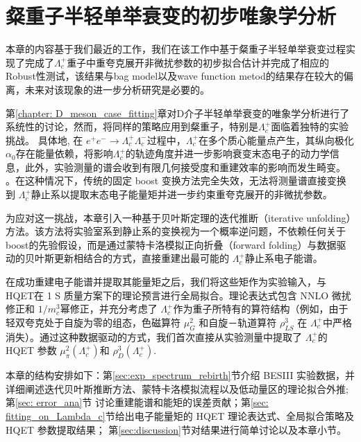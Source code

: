 \chapter{粲重子半轻单举衰变的初步唯象学分析}
\label{sec:charm_baryon_case}
本章的内容基于我们最近的工作\cite{Shao:2025rel}，我们在该工作中基于粲重子半轻单举衰变过程实现了完成了$\Lambda_c^+$重子中重夸克展开非微扰参数的初步拟合估计并完成了相应的Robust性测试，该结果与bag model以及wave function metod的结果存在较大的偏离，未来对该现象的进一步分析研究是必要的。

第\ref{chapter: D_meson_case_fitting}章对D介子半轻单举衰变的唯象学分析进行了系统性的讨论，然而，将同样的策略应用到粲重子，特别是$\Lambda_c^+$面临着独特的实验挑战。
具体地, 在 $e^{+} e^{-} \rightarrow \Lambda_c^{+} \Lambda_c^{-}$过程中，$\Lambda_c^{+}$在多个质心能量点产生，其纵向极化$\alpha_0$存在能量依赖，将影响$\Lambda_c^+$的轨迹角度并进一步影响衰变末态电子的动力学信息，此外，实验测量的谱会收到有限几何接受度和重建效率的影响而发生畸变。 。在这种情况下，传统的固定 boost 变换方法完全失效，无法将测量谱直接变换到 $\Lambda_c^{+}$静止系以提取末态电子能量矩并进一步约束重夸克展开的非微扰参数。

为应对这一挑战，本章引入一种基于贝叶斯定理的迭代推断（iterative unfolding）方法。该方法将实验室系到静止系的变换视为一个概率逆问题，不依赖任何关于 boost的先验假设，而是通过蒙特卡洛模拟正向折叠（forward folding）与数据驱动的贝叶斯更新相结合的方式，直接重建出最可能的 $\Lambda_c^{+}$静止系电子能谱。

在成功重建电子能谱并提取其能量矩之后，我们将这些矩作为实验输入，与 HQET在 1 S 质量方案下的理论预言进行全局拟合。理论表达式包含 NNLO 微扰修正和 $1 / m_c^3$幂修正，并充分考虑了 $\Lambda_c^{+}$作为重子所特有的算符结构（例如，由于轻双夸克处于自旋为零的组态，色磁算符 $\mu_G^2$ 和自旋－轨道算符 $\rho_{L S}^3$ 在 $\Lambda_c^{+}$中严格消失）。通过这种数据驱动的方式，我们首次直接从实验测量中提取了 $\Lambda_c^{+}$的 HQET 参数 $\mu_\pi^2\left(\Lambda_c^{+}\right)$和 $\rho_D^3\left(\Lambda_c^{+}\right)$.

本章的结构安排如下：第\ref{sec:exp_spectrum_rebirth}节介绍 BESIII 实验数据，并详细阐述迭代贝叶斯推断方法、蒙特卡洛模拟流程以及低动量区的理论拟合外推; 
第\ref{sec: error_ana}节 讨论重建能谱和能矩的误差贡献；第\ref{sec: fitting_on_Lambda_c}节给出电子能量矩的 HQET 理论表达式、全局拟合策略及 HQET 参数提取结果；
第\ref{sec:discussion}节对结果进行简单讨论以及本章小节。

